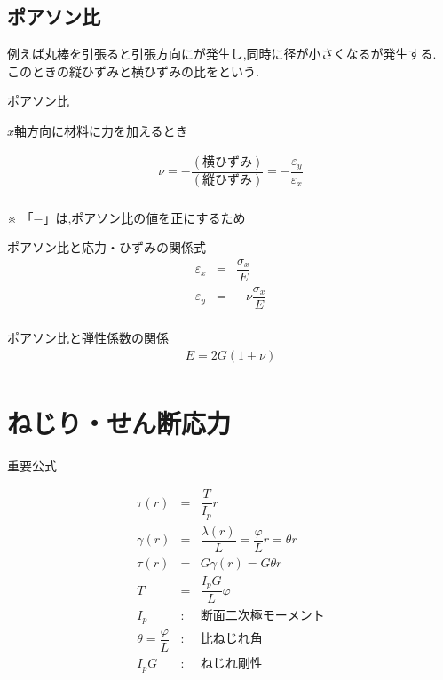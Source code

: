 \documentclass[a4paper]{jsarticle}
\begin{document}
\subsection{ポアソン比}
例えば丸棒を引張ると引張方向にが発生し,同時に径が小さくなるが発生する.\\
このときの縦ひずみと横ひずみの比をという.
\begin{itembox}[l]{ポアソン比}
    \begin{center}
        $x$軸方向に材料に力を加えるとき
    \end{center}
    \begin{eqnarray*}
        \nu=-\dfrac{\left(横ひずみ\right)}{\left(縦ひずみ\right)}=-\dfrac{\varepsilon_y}{\varepsilon_x}\\
    \end{eqnarray*}
    \begin{center}
        ※ 「$-$」は,ポアソン比の値を正にするため
    \end{center}
\end{itembox}
\begin{itembox}[l]{ポアソン比と応力・ひずみの関係式}
    \begin{eqnarray*}
        \varepsilon_x&=&\dfrac{\sigma_x}{E}\\
        \varepsilon_y&=&-\nu\dfrac{\sigma_x}{E}\\
    \end{eqnarray*}
\end{itembox}
\begin{itembox}[l]{ポアソン比と弾性係数の関係}
    \begin{eqnarray*}
        E=2G\left(1+\nu\right)\\
    \end{eqnarray*}
\end{itembox}
\section{ねじり・せん断応力}
\begin{itembox}[l]{重要公式}
    \begin{center}
        \begin{eqnarray*}
            \tau\left(r\right)&=&\dfrac{T}{I_p} r\\
            \gamma\left(r\right)&=&\dfrac{\lambda\left(r\right)}{L}=\dfrac{\varphi}{L}r=\theta r\\
            \tau\left(r\right)&=&G\gamma\left(r\right)=G\theta r\\
            T&=&\dfrac{I_pG}{L}\varphi\\
            I_p&:&断面二次極モーメント\\
            \theta=\dfrac{\varphi}{L}&:&比ねじれ角\\
            I_pG&:&ねじれ剛性\\
        \end{eqnarray*}
    \end{center}
\end{itembox}
\end{document}

